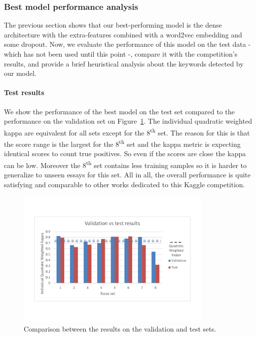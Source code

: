\documentclass[a4paper,12pt,english]{article}
\begin{document}
\subsubsection{Best model performance analysis}
The previous section shows that our best-performing model is the dense architecture with the extra-features combined with a word2vec embedding and some dropout. Now, we evaluate the performance of this model on the test data - which has not been used until this point -, compare it with the competition's results, and provide a brief heuristical analysis about the keywords detected by our model.

\paragraph{Test results} We show the performance of the best model on the test set compared to the performance on the validation set on Figure~\ref{fig:testresults}. The individual quadratic weighted kappa are equivalent for all sets except for the 8\textsuperscript{th} set. The reason for this is that the score range is the largest for the 8\textsuperscript{th} set and the kappa metric is expecting identical scores to count true positives. So even if the scores are close the kappa can be low. Moreover the 8\textsuperscript{th} set contains less training samples so it is harder to generalize to unseen essays for this set. All in all, the overall performance is quite satisfying and comparable to other works dedicated to this Kaggle competition.

\begin{figure}
\vspace*{-1.5cm}
\includegraphics[width=0.85\textwidth]{fig/test.pdf}
\caption{Comparison between the results on the validation and test sets.}
\label{fig:testresults}
\end{figure}
\end{document}
